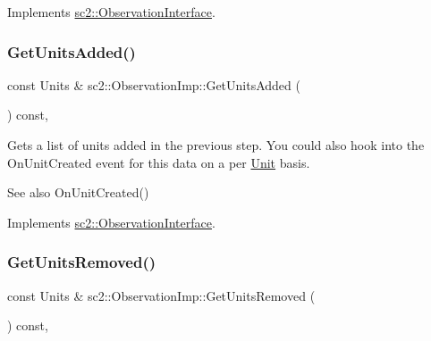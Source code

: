 Implements \hyperlink{classsc2_1_1_observation_interface_aa43cfa17a9ac893500bce33eb41e6171}{sc2\+::\+Observation\+Interface}.

\mbox{\label{classsc2_1_1_observation_imp_a0f4061d42b035d297b8a8bd0f73e5241}} 
\subsubsection{\texorpdfstring{Get\+Units\+Added()}{GetUnitsAdded()}}
{\footnotesize\ttfamily const Units \& sc2\+::\+Observation\+Imp\+::\+Get\+Units\+Added (\begin{DoxyParamCaption}{ }\end{DoxyParamCaption}) const\hspace{0.3cm}{\ttfamily [final]}, {\ttfamily [virtual]}}

Gets a list of units added in the previous step. You could also hook into the On\+Unit\+Created event for this data on a per \hyperlink{classsc2_1_1_unit}{Unit} basis. \begin{DoxySeeAlso}{See also}
On\+Unit\+Created() 
\end{DoxySeeAlso}


Implements \hyperlink{classsc2_1_1_observation_interface_a30cdffc5d5c87797c5c154fe50bad768}{sc2\+::\+Observation\+Interface}.

\mbox{\label{classsc2_1_1_observation_imp_a6c2fd3bf3abf69dcb868c7cd0a7ffeae}} 
\subsubsection{\texorpdfstring{Get\+Units\+Removed()}{GetUnitsRemoved()}}
{\footnotesize\ttfamily const Units \& sc2\+::\+Observation\+Imp\+::\+Get\+Units\+Removed (\begin{DoxyParamCaption}{ }\end{DoxyParamCaption}) const\hspace{0.3cm}{\ttfamily [final]}, {\ttfamily [virtual]}}

